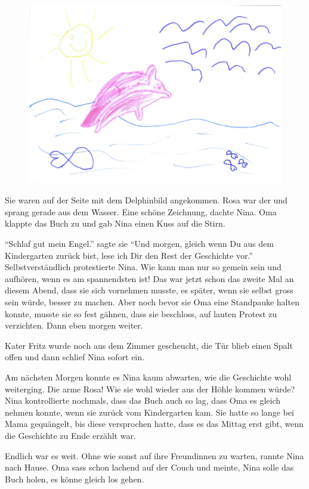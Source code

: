 \medskip
\begin{figure}[H]
\centering
\includegraphics[width=.7\textwidth]{bilder/oma1.pdf}
\end{figure}
\medskip
\begin{mdframed}[style=mystyle]
Sie waren auf der Seite mit dem Delphinbild angekommen. Rosa war der und sprang gerade aus dem Wasser. Eine schöne Zeichnung, dachte Nina. Oma klappte das Buch zu und gab Nina einen Kuss auf die Stirn.

\enquote{Schlaf gut mein Engel.} sagte sie \enquote{Und morgen, gleich wenn Du aus dem Kindergarten zurück bist, lese ich Dir den Rest der Geschichte vor.} Selbstverständlich protestierte Nina. Wie kann man nur so gemein sein und aufhören, wenn es am spannendsten ist! Das war jetzt schon das zweite Mal an diesem Abend, dass sie sich vornehmen musste, es später, wenn sie selbst gross sein würde, besser zu machen. Aber noch bevor sie Oma eine Standpauke halten konnte, musste sie so fest gähnen, dass sie beschloss, auf lauten Protest zu verzichten. Dann eben morgen weiter.

Kater Fritz wurde noch aus dem Zimmer gescheucht, die Tür blieb einen Spalt offen und dann schlief Nina sofort ein.

Am nächsten Morgen konnte es Nina kaum abwarten, wie die Geschichte wohl weiterging. Die arme Rosa! Wie sie wohl wieder aus der Höhle kommen würde? Nina kontrollierte nochmals, dass das Buch auch so lag, dass Oma es gleich nehmen konnte, wenn sie zurück vom Kindergarten kam. Sie hatte so lange bei Mama gequängelt, bis diese versprochen hatte, dass es das Mittag erst gibt, wenn die Geschichte zu Ende erzählt war.

Endlich war es weit. Ohne wie sonst auf ihre Freundinnen zu warten, rannte Nina nach Hause. Oma sass schon lachend auf der Couch und meinte, Nina solle das Buch holen, es könne gleich los gehen.


\end{mdframed}
